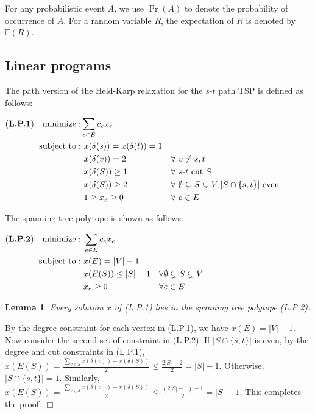 \documentclass[11pt]{article}
\newcommand{\qed}{\hspace*{\fill}$\Box$}
\newtheorem{lemma}[theorem]{Lemma}
\newenvironment{proof}[1][Proof. ]{\noindent {\bf #1 }}{\qed}
\begin{document}
For any probabilistic event $A$,
we use $\Pr(A)$ to denote the probability of occurrence of $A$.
For a random variable $R$,
the expectation of $R$ is denoted by $\mathbb{E}(R)$.



\subsection{Linear programs}

The path version of the Held-Karp relaxation for
the $s$-$t$ path TSP is defined as follows:

$
     \begin{aligned}
     \hbox{({\bf L.P.1})}\quad  {\rm minimize}: & \sum_{e \in E} c_ex_e &&  \\
{\rm subject~to}: & \ x(\delta(s))= x(\delta(t))= 1 &&  \\
& \ x(\delta(v))=2   && \forall \ v\neq s, t   \\
& \ x(\delta(S))\geq 1 && \forall \ s\text{-}t \mbox{ cut } S   \\
& \ x(\delta(S)) \geq  2  && \forall \ \emptyset \subsetneq S \subsetneq V, |S \cap \{s, t\}| \mbox{ even }   \\
& \ 1 \geq x_e  \geq   0  && \forall \ e \in E
     \end{aligned}
$

The spanning tree polytope is shown as follows:

$
     \begin{aligned}
     \hbox{({\bf L.P.2})}\quad  {\rm minimize} : &\ \sum_{e \in E} c_ex_e && \\
{\rm subject~to} : & \ x(E)  = |V|-1  && \\
& \ x(E(S))  \leq  |S|-1 && \forall  \emptyset\subsetneq S\subsetneq V  \\
& \ x_e  \geq  0 && \forall e \in E
     \end{aligned}
$

\begin{lemma}
Every solution $x$ of (L.P.1) lies in the spanning tree polytope (L.P.2).
\end{lemma}
\begin{proof}
By the degree constraint for each vertex in (L.P.1), we have $x(E)  = |V|-1$. Now consider the second set of constraint in (L.P.2). If $|S \cap \{s, t\}|$ is even, by the degree and cut constraints in (L.P.1), $x(E(S)) = \frac{\sum_{v\in S} x(\delta(v)) - x(\delta(S))}{2} \leq \frac{2|S|-2}{2}= |S|-1$. Otherwise, $|S \cap \{s, t\}|=1$. Similarly, $x(E(S)) = \frac{\sum_{v\in S} x(\delta(v)) - x(\delta(S))}{2} \leq \frac{(2|S|-1)-1}{2}=|S|-1$. This completes the proof.
\end{proof}
\end{document}
